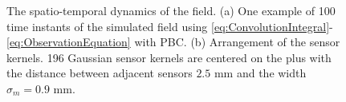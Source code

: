\documentclass[10pt,twocolumn,twoside]{IEEEtran}
\begin{document}
\begin{figure}[ht]
	\centering
	\caption{The spatio-temporal dynamics of the field. (a) One example of 100 time instants of the simulated field using \eqref{eq:ConvolutionIntegral}-\eqref{eq:ObservationEquation}   with PBC. (b) Arrangement of the sensor kernels. 196 Gaussian sensor kernels are centered on the plus with the distance between adjacent sensors $2.5$ mm and the width $\sigma_m=0.9$ mm.}
	\label{fig:SimulatedData}
\end{figure}
\end{document}
